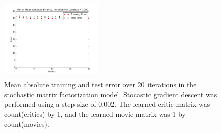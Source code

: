 \documentclass[12pt]{article}
\newcommand{\factwidth}{0.44}
\newcommand{\factheight}{1.6in}
\begin{document}
\begin{figure}[H]
\includegraphics[width=0\factwidth\textwidth,height=\factheight]{matrix_plots/test-i40d1l1000.png}
\caption{Mean absolute training and test error over 20 iterations in the stochastic matrix factorization model. Stocastic gradient descent was performed using a step size of 0.002. The learned critic matrix was count(critics) by 1, and the learned movie matrix was 1 by count(movies).}
\label{fig:fac-d1}
\end{figure}
\end{document}
